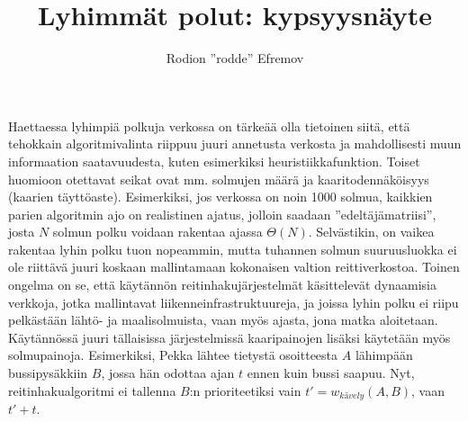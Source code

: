 \documentclass[12pt]{article}
\title{Lyhimmät polut: kypsyysnäyte}
\author{Rodion ''rodde'' Efremov}
\begin{document}
\maketitle
\newpage

\noindent Haettaessa lyhimpiä polkuja verkossa on tärkeää olla tietoinen siitä, että tehokkain algoritmivalinta riippuu juuri annetusta verkosta ja mahdollisesti muun informaation saatavuudesta, kuten esimerkiksi heuristiikkafunktion. Toiset huomioon otettavat seikat ovat mm. solmujen määrä ja kaaritodennäköisyys (kaarien täyttöaste). Esimerkiksi, jos verkossa on noin 1000 solmua, kaikkien parien algoritmin ajo on realistinen ajatus, jolloin saadaan ''edeltäjämatriisi'', josta $N$ solmun polku voidaan rakentaa ajassa $\Theta(N)$. Selvästikin, on vaikea rakentaa lyhin polku tuon nopeammin, mutta tuhannen solmun suuruusluokka ei ole riittävä juuri koskaan mallintamaan kokonaisen valtion reittiverkostoa. Toinen ongelma on se, että käytännön reitinhakujärjestelmät käsittelevät dynaamisia verkkoja, jotka mallintavat liikenneinfrastruktuureja, ja joissa lyhin polku ei riipu pelkästään lähtö- ja maalisolmuista, vaan myös ajasta, jona matka aloitetaan. Käytännössä juuri tällaisissa järjestelmissä kaaripainojen lisäksi käytetään myös solmupainoja. Esimerkiksi, Pekka lähtee tietystä osoitteesta $A$ lähimpään bussipysäkkiin $B$, jossa hän odottaa ajan $t$ ennen kuin bussi saapuu. Nyt, reitinhakualgoritmi ei tallenna $B$:n prioriteetiksi vain $t' = w_{kävely}(A, B)$, vaan $t' + t$.
\end{document}
